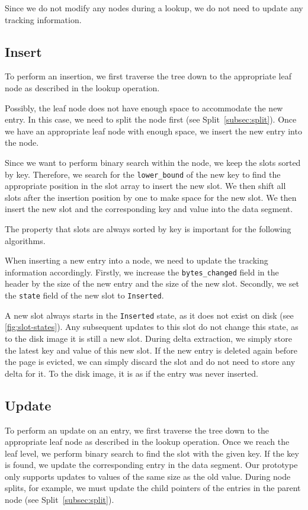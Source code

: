 Since we do not modify any nodes during a lookup, we do not need to update any tracking information.

\subsection*{Insert}
To perform an insertion, we first traverse the tree down to the appropriate leaf node as described in the lookup operation.

Possibly, the leaf node does not have enough space to accommodate the new entry.
In this case, we need to split the node first (see Split~\ref{subsec:split}).
Once we have an appropriate leaf node with enough space, we insert the new entry into the node.

Since we want to perform binary search within the node, we keep the slots sorted by key.
Therefore, we search for the \texttt{lower\_bound} of the new key to find the appropriate position in the slot array to insert the new slot.
We then shift all slots after the insertion position by one to make space for the new slot.
We then insert the new slot and the corresponding key and value into the data segment.

The property that slots are always sorted by key is important for the following algorithms.

When inserting a new entry into a node, we need to update the tracking information accordingly.
Firstly, we increase the \texttt{bytes\_changed} field in the header by the size of the new entry and the size of the new slot.
Secondly, we set the \texttt{state} field of the new slot to \texttt{Inserted}.

A new slot always starts in the \texttt{Inserted} state, as it does not exist on disk (see \autoref{fig:slot-states}).
Any subsequent updates to this slot do not change this state, as to the disk image it is still a new slot.
During delta extraction, we simply store the latest key and value of this new slot.
If the new entry is deleted again before the page is evicted, we can simply discard the slot and do not need to store any delta for it.
To the disk image, it is as if the entry was never inserted.

\subsection*{Update}
To perform an update on an entry, we first traverse the tree down to the appropriate leaf node as described in the lookup operation.
Once we reach the leaf level, we perform binary search to find the slot with the given key.
If the key is found, we update the corresponding entry in the data segment.
Our prototype only supports updates to values of the same size as the old value.
During node splits, for example, we must update the child pointers of the entries in the parent node (see Split~\ref{subsec:split}).

